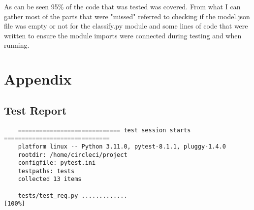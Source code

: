 \documentclass[12pt, titlepage]{article}
\begin{document}
\begin{emumerate}
As can be seen 95\% of the code that was tested was covered. From what I can gather most of the parts that were
"missed" referred to checking if the model.json file was empty or not for the classify.py module and some lines of code
that were written to ensure the module imports were connected during testing and when running.

\newpage{}




\newpage{}

\section{Appendix}
\subsection{Test Report} \label{test_report}
\begin{small} 
  \begin{verbatim} 
    ============================= test session starts ==============================
    platform linux -- Python 3.11.0, pytest-8.1.1, pluggy-1.4.0
    rootdir: /home/circleci/project
    configfile: pytest.ini
    testpaths: tests
    collected 13 items                                                             
    
    tests/test_req.py .............                                          [100%]
    

\end{verbatim}
\end{small}
\end{emumerate}
\end{document}
